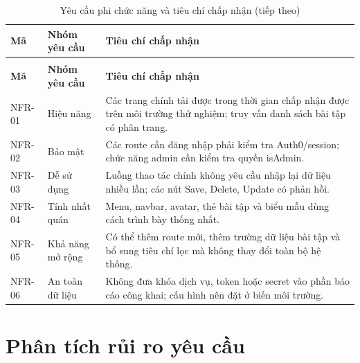 \begingroup
\setlength{\tabcolsep}{3pt}
\renewcommand{\arraystretch}{1.25}
\begin{longtable}{|P{0.220\textwidth}|P{0.330\textwidth}|P{0.370\textwidth}|}
\caption{Yêu cầu phi chức năng và tiêu chí chấp nhận}\\
\hline
\textbf{Mã} & \textbf{Nhóm yêu cầu} & \textbf{Tiêu chí chấp nhận} \\
\hline
\endfirsthead
\caption[]{Yêu cầu phi chức năng và tiêu chí chấp nhận (tiếp theo)}\\
\hline
\textbf{Mã} & \textbf{Nhóm yêu cầu} & \textbf{Tiêu chí chấp nhận} \\
\hline
\endhead
NFR-01 & Hiệu năng & Các trang chính tải được trong thời gian chấp nhận được trên môi trường thử nghiệm; truy vấn danh sách bài tập có phân trang. \\
\hline
NFR-02 & Bảo mật & Các route cần đăng nhập phải kiểm tra Auth0/session; chức năng admin cần kiểm tra quyền isAdmin. \\
\hline
NFR-03 & Dễ sử dụng & Luồng thao tác chính không yêu cầu nhập lại dữ liệu nhiều lần; các nút Save, Delete, Update có phản hồi. \\
\hline
NFR-04 & Tính nhất quán & Menu, navbar, avatar, thẻ bài tập và biểu mẫu dùng cách trình bày thống nhất. \\
\hline
NFR-05 & Khả năng mở rộng & Có thể thêm route mới, thêm trường dữ liệu bài tập và bổ sung tiêu chí lọc mà không thay đổi toàn bộ hệ thống. \\
\hline
NFR-06 & An toàn dữ liệu & Không đưa khóa dịch vụ, token hoặc secret vào phần báo cáo công khai; cấu hình nên đặt ở biến môi trường. \\
\hline
\end{longtable}
\endgroup

\section{Phân tích rủi ro yêu cầu}

